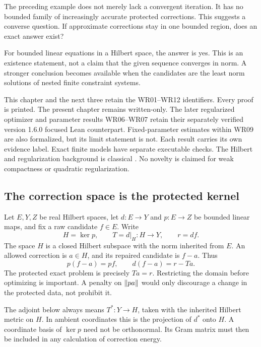\clearpage
{}\label{sec:bounded-realization}
The preceding example does not merely lack a convergent iteration. It has no bounded family of increasingly accurate protected corrections. This suggests a converse question. If approximate corrections stay in one bounded region, does an exact answer exist?

For bounded linear equations in a Hilbert space, the answer is yes. This is an existence statement, not a claim that the given sequence converges in norm. A stronger conclusion becomes available when the candidates are the least norm solutions of nested finite constraint systems.

\begin{scopebox}
This chapter and the next three retain the WR01--WR12 identifiers. Every proof is printed. The present chapter remains written-only. The later regularized optimizer and parameter results WR06--WR07 retain their separately verified version 1.6.0 focused Lean counterpart. Fixed-parameter estimates within WR09 are also formalized, but its limit statement is not. Each result carries its own evidence label. Exact finite models have separate executable checks. The Hilbert and regularization background is classical \cite{clason-inverse}. No novelty is claimed for weak compactness or quadratic regularization.
\end{scopebox}

\subsection{The correction space is the protected kernel}
Let $E,Y,Z$ be real Hilbert spaces, let $d:E\to Y$ and $p:E\to Z$ be bounded linear maps, and fix a raw candidate $f\in E$. Write
\[
 H=\ker p,\qquad T=d|_H:H\to Y,\qquad r=df.
\]
The space $H$ is a closed Hilbert subspace with the norm inherited from $E$. An allowed correction is $a\in H$, and its repaired candidate is $f-a$. Thus
\[
 p(f-a)=pf,\qquad d(f-a)=r-Ta.
\]
The protected exact problem is precisely $Ta=r$. Restricting the domain before optimizing is important. A penalty on $\left\lVert pa\right\rVert$ would only discourage a change in the protected data, not prohibit it.

The adjoint below always means $T^*:Y\to H$, taken with the inherited Hilbert metric on $H$. In ambient coordinates this is the projection of $d^*$ onto $H$. A coordinate basis of $\ker p$ need not be orthonormal. Its Gram matrix must then be included in any calculation of correction energy.

